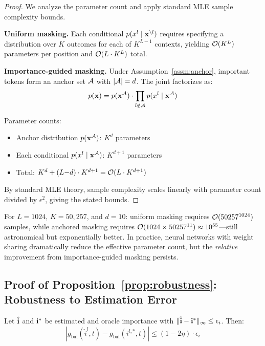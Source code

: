 \begin{proof}
We analyze the parameter count and apply standard MLE sample complexity bounds.

\textbf{Uniform masking.} Each conditional $p(x^l \mid \mathbf{x}^{\setminus l})$ requires specifying a distribution over $K$ outcomes for each of $K^{L-1}$ contexts, yielding $\mathcal{O}(K^L)$ parameters per position and $\mathcal{O}(L \cdot K^L)$ total.

\textbf{Importance-guided masking.} Under Assumption~\ref{assm:anchor}, important tokens form an anchor set $\mathcal{A}$ with $|\mathcal{A}| = d$. The joint factorizes as:
\begin{equation}
    p(\mathbf{x}) = p(\mathbf{x}^{\mathcal{A}}) \cdot \prod_{l \notin \mathcal{A}} p(x^l \mid \mathbf{x}^{\mathcal{A}})
\end{equation}

Parameter counts:
\begin{itemize}
    \item Anchor distribution $p(\mathbf{x}^{\mathcal{A}})$: $K^d$ parameters
    \item Each conditional $p(x^l \mid \mathbf{x}^{\mathcal{A}})$: $K^{d+1}$ parameters
    \item Total: $K^d + (L{-}d) \cdot K^{d+1} = \mathcal{O}(L \cdot K^{d+1})$
\end{itemize}

By standard MLE theory, sample complexity scales linearly with parameter count divided by $\epsilon^2$, giving the stated bounds.
\end{proof}

\begin{remark}
For $L = 1024$, $K = 50{,}257$, and $d = 10$: uniform masking requires $\mathcal{O}(50257^{1024})$ samples, while anchored masking requires $\mathcal{O}(1024 \times 50257^{11}) \approx 10^{55}$---still astronomical but exponentially better. In practice, neural networks with weight sharing dramatically reduce the effective parameter count, but the \textit{relative} improvement from importance-guided masking persists.
\end{remark}

\subsection{Proof of Proposition~\ref{prop:robustness}: Robustness to Estimation Error}
\label{app:robustness-proof}

\begin{proposition}
Let $\hat{\mathbf{i}}$ and $\mathbf{i}^*$ be estimated and oracle importance with $\|\hat{\mathbf{i}} - \mathbf{i}^*\|_\infty \leq \epsilon_i$. Then:
\begin{equation}
    \left|g_{\text{bal}}(\hat{i}^l, t) - g_{\text{bal}}(i^{l,*}, t)\right| \leq (1 - 2\eta) \cdot \epsilon_i
\end{equation}
\end{proposition}

